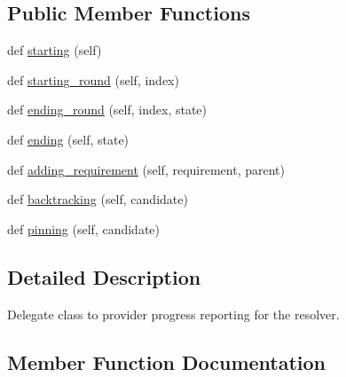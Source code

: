 \subsection*{Public Member Functions}
\begin{DoxyCompactItemize}
\item 
def \hyperlink{classpip_1_1__vendor_1_1resolvelib_1_1reporters_1_1BaseReporter_ad0e0aaaa590395ee4ca1710cc4cba913}{starting} (self)
\item 
def \hyperlink{classpip_1_1__vendor_1_1resolvelib_1_1reporters_1_1BaseReporter_a0ef5f2201ff5bed41f57ebbdba7caec5}{starting\+\_\+round} (self, index)
\item 
def \hyperlink{classpip_1_1__vendor_1_1resolvelib_1_1reporters_1_1BaseReporter_ace5fc81fcfe24f59a263119f7c01ee31}{ending\+\_\+round} (self, index, state)
\item 
def \hyperlink{classpip_1_1__vendor_1_1resolvelib_1_1reporters_1_1BaseReporter_aebc4b7ba39644a91d34430020cf50801}{ending} (self, state)
\item 
def \hyperlink{classpip_1_1__vendor_1_1resolvelib_1_1reporters_1_1BaseReporter_a1d2ce8f9d6078b26cc8492c805107680}{adding\+\_\+requirement} (self, requirement, parent)
\item 
def \hyperlink{classpip_1_1__vendor_1_1resolvelib_1_1reporters_1_1BaseReporter_a3e424690ece597e4b5b16126f61715d7}{backtracking} (self, candidate)
\item 
def \hyperlink{classpip_1_1__vendor_1_1resolvelib_1_1reporters_1_1BaseReporter_a480f8b135ae0ed36a7439538110ee34c}{pinning} (self, candidate)
\end{DoxyCompactItemize}


\subsection{Detailed Description}
\begin{DoxyVerb}Delegate class to provider progress reporting for the resolver.\end{DoxyVerb}
 

\subsection{Member Function Documentation}
\mbox{\label{classpip_1_1__vendor_1_1resolvelib_1_1reporters_1_1BaseReporter_a1d2ce8f9d6078b26cc8492c805107680}} 
